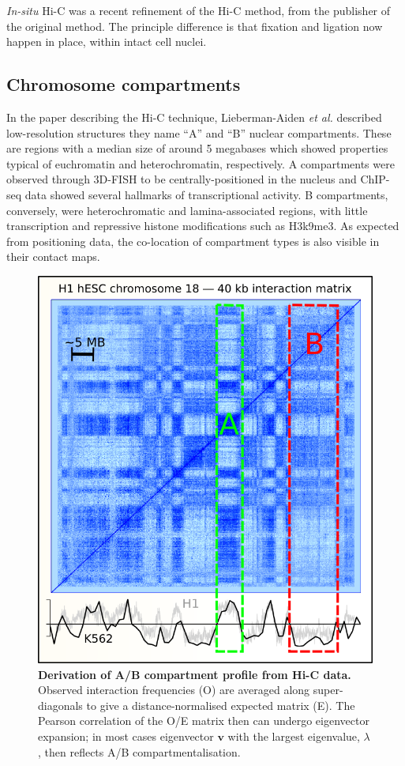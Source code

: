 \documentclass[a4paper,11pt,oneside]{book}
\begin{document}
\emph{In-situ} Hi-C was a recent refinement of the Hi-C method, from the publisher of the original method.\cite{Rao2014} The principle difference is that fixation and ligation now happen in place, within intact cell nuclei.


\subsection{Chromosome compartments}\label{sec:compartments}

In the paper describing the Hi-C technique,\cite{Lieberman2009}  Lieberman-Aiden \emph{et
  al.} described low-resolution structures they name  ``A'' and ``B'' nuclear compartments. These are regions with a median size of around 5 megabases which showed properties typical
of euchromatin and heterochromatin, respectively. A compartments were observed through 3D-FISH to be centrally-positioned in the nucleus and  ChIP-seq data showed several hallmarks of transcriptional activity. B compartments, conversely, were heterochromatic and lamina-associated regions, with little transcription and repressive histone modifications such as H3k9me3.\cite{Lieberman2009, DeWit2012} As expected from positioning data, the co-location of compartment types is also visible in their contact maps. 

\begin{figure}
\begin{center}
\includegraphics[width=.75\textwidth]{figs/eigcalc.png}
\captionsetup{width=\textwidth}
\caption[Derivation of A/B compartment profile from Hi-C data.]{ {\bf Derivation of A/B compartment profile from Hi-C data.} 
Observed interaction frequencies (O) are averaged along super-diagonals to give a distance-normalised expected matrix (E). The Pearson correlation of the O/E matrix then can undergo eigenvector expansion; in most cases eigenvector $\mathbf{v}$ with the largest eigenvalue, $\lambda$, then reflects A/B compartmentalisation.\cite{Lieberman2009}
}\label{fig:eigcalc}
\end{center}
\end{figure} 
\end{document}
